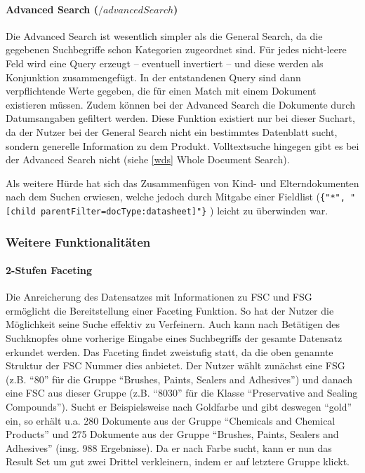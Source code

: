 \documentclass[oneside, a4paper, 12pt, titlepage]{article}
\begin{document}
\paragraph{Advanced Search (\(/advancedSearch\))}
Die Advanced Search ist wesentlich simpler als die General Search, da die gegebenen Suchbegriffe schon Kategorien zugeordnet sind.
Für jedes nicht-leere Feld wird eine Query erzeugt -- eventuell invertiert -- und diese werden als Konjunktion zusammengefügt. In der entstandenen Query sind dann verpflichtende Werte gegeben, die für einen Match mit einem Dokument existieren müssen. Zudem können bei der Advanced Search die Dokumente durch Datumsangaben gefiltert werden. Diese Funktion existiert nur bei dieser Suchart, da der Nutzer bei der General Search nicht ein bestimmtes Datenblatt sucht, sondern generelle Information zu dem Produkt. Volltextsuche hingegen gibt es bei der Advanced Search nicht (siehe \ref{wds} Whole Document Search).

Als weitere Hürde hat sich das Zusammenfügen von Kind- und Elterndokumenten nach dem Suchen erwiesen, welche jedoch durch Mitgabe einer Fieldlist (\texttt{\{"*", "[child parentFilter=docType:datasheet]"\}}
) leicht zu überwinden war.

\subsubsection{Weitere Funktionalitäten}

\paragraph{2-Stufen Faceting}
Die Anreicherung des Datensatzes mit Informationen zu FSC und FSG ermöglicht die Bereitstellung einer Faceting Funktion. So hat der Nutzer die Möglichkeit seine Suche effektiv zu Verfeinern. Auch kann nach Betätigen des Suchknopfes ohne vorherige Eingabe eines Suchbegriffs der gesamte Datensatz erkundet werden. Das Faceting findet zweistufig statt, da die oben genannte Struktur der FSC Nummer dies anbietet. Der Nutzer wählt zunächst eine FSG (z.B. ``80'' für die Gruppe ``Brushes, Paints, Sealers and Adhesives'') und danach eine FSC aus dieser Gruppe (z.B. ``8030'' für die Klasse ``Preservative and Sealing Compounds''). Sucht er Beispielsweise nach Goldfarbe und gibt deswegen ``gold'' ein, so erhält u.a. 280 Dokumente aus der Gruppe ``Chemicals and Chemical Products'' und 275 Dokumente aus der Gruppe ``Brushes, Paints, Sealers and Adhesives'' (insg. 988 Ergebnisse). Da er nach Farbe sucht, kann er nun das Result Set um gut zwei Drittel verkleinern, indem er auf letztere Gruppe klickt.
\end{document}
